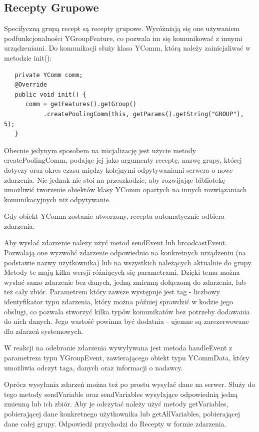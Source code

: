 \documentclass[11pt,a4paper,polish,thesis]{dcsbook}
\begin{document}
\subsection{Recepty Grupowe}
Specifyczną grupą recept są recepty grupowe. Wyróżniają się one używaniem podfunkcjonalności YGroupFeature, co pozwala im się komunikować z innymi urządzeniami.
Do komunikacji służy klasa YComm, którą należy zainicjaliwać w metodzie init():
\begin{verbatim}
   private YComm comm;
   @Override
   public void init() {
      comm = getFeatures().getGroup()
           .createPoolingComm(this, getParams().getString("GROUP"), 5);
   }
\end{verbatim}
Obecnie jedynym sposobem na inicjalizację jest użycie metody createPoolingComm, podając jej jako argumenty  receptę, nazwę grupy, której dotyczy oraz okres czasu między kolejnymi odpytywaniami serwera o nowe zdarzenia. Nic jednak nie stoi na przeszkodzie, aby rozwijając bibliotekę umożliwić tworzenie obiektów klasy YComm opartych na innych rozwiązaniach komunikacyjnych niż odpytywanie. 

Gdy obiekt YComm zostanie utworzony, recepta automatycznie odbiera zdarzenia.

Aby wysłać zdarzenie należy użyć metod sendEvent lub broadcastEvent. Pozwalają one wyzwolić zdarzenie odpowiednio na konkretnych urządzeniu (na podstawie nazwy użytkownika) lub na wszystkich należących aktualnie do grupy. Metody te mają kilka wersji różniących się parametrami. Dzięki temu można wysłać samo zdarzenie bez danych, jedną zmienną dołączoną do zdarzenia, lub też cały zbiór. Parametrem który zawsze występuje jest tag - liczbowy identyfikator typu zdarzenia, który można później sprawdzić w kodzie jego obsługi, co pozwala stworzyć kilka typów komunikatów bez potrzeby dodawania do nich danych. Jego wartość powinna być dodatnia - ujemne są zarezerwowane dla zdarzeń systemowych.

W reakcji na odebranie zdarzenia wywyływana jest metoda handleEvent z parametrem typu YGroupEvent,  zawierającego obiekt typu YCommData, który umożliwia odczyt taga, danych oraz informacji o nadawcy.

Oprócz wysyłania zdarzeń można też po prostu wysyłać dane na serwer. Służy do tego metody sendVariable oraz sendVariables wysyłające odpowiednią jedną zmienną lub ich zbiór. Aby je odczytać należy użyć metody getVariables, pobierającej dane konkretnego użytkownika lub getAllVariables, pobierającej dane całej grupy. Odpowiedź przychodzi do Recepty w formie zdarzenia.
\end{document}
